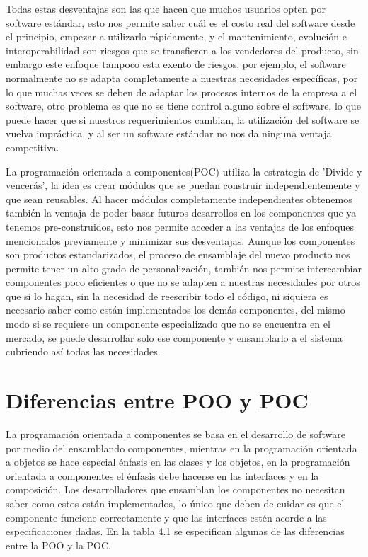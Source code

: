 \documentclass[12pt,a4paper,spanish,openany]{book}
\begin{document}
Todas estas desventajas son las que hacen que muchos usuarios opten por software
estándar, esto nos permite saber cuál es el costo real del software desde el
principio, empezar a utilizarlo rápidamente, y el mantenimiento, evolución e
interoperabilidad son riesgos que se transfieren a los vendedores del producto,
sin embargo este enfoque tampoco esta exento de riesgos, por ejemplo, el
software normalmente no se adapta completamente a nuestras necesidades
específicas, por lo que muchas veces se deben de adaptar los procesos internos
de la empresa a el software, otro problema es que no se tiene control alguno
sobre el software, lo que puede hacer que si nuestros requerimientos cambian, la
utilización del software se vuelva impráctica, y al ser un software estándar no
nos da ninguna ventaja competitiva. 

La programación orientada a componentes(POC)
utiliza la estrategia de 'Divide y vencerás', la idea es crear módulos que se
puedan construir independientemente y que sean reusables. Al hacer módulos
completamente independientes obtenemos también la ventaja de poder basar futuros
desarrollos en los componentes que ya tenemos pre-construidos, esto nos permite
acceder a las ventajas de los enfoques mencionados previamente y minimizar sus
desventajas. Aunque los componentes son productos estandarizados, el proceso de ensamblaje del nuevo producto nos permite tener un alto grado de personalización, también nos permite intercambiar componentes poco eficientes o que no se adapten a nuestras
necesidades por otros que si lo hagan, sin la necesidad de reescribir todo el
código, ni siquiera es necesario saber como están implementados los demás
componentes, del mismo modo si se requiere un componente especializado que no se
encuentra en el mercado, se puede desarrollar solo ese componente y ensamblarlo
a el sistema cubriendo así todas las necesidades.



\section{Diferencias entre POO y POC}

La programación orientada a componentes se basa en el desarrollo de software
por medio del ensamblando componentes, mientras en la programación
orientada a objetos se hace especial énfasis en las clases y los
objetos, en la programación orientada a componentes el énfasis debe hacerse en
las interfaces y en la composición. Los desarrolladores que ensamblan los
componentes no necesitan saber como estos están implementados, lo único que
deben de cuidar es que el componente funcione correctamente y que las
interfaces estén acorde a las especificaciones dadas. En la tabla 4.1 se
especifican algunas de las diferencias entre la POO y la POC.
\end{document}
